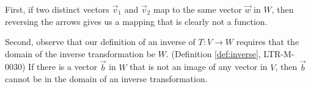 \documentclass{ximera}
\begin{document}
 First, if two distinct vectors $\vec{v}_1$ and $\vec{v}_2$ map to the same vector $\vec{w}$ in $W$, then reversing the arrows gives us a mapping that is clearly not a function. %
 

\begin{center}
\end{center}
  

Second, observe that our definition of an inverse of $T:V\rightarrow W$ requires that the domain of the inverse transformation be $W$. (Definition \ref{def:inverse}, LTR-M-0030)  If there is a vector $\vec{b}$ in $W$ that is not an image of any vector in $V$, then $\vec{b}$ cannot be in the domain of an inverse transformation. %

\begin{center}
  \label{fig:notonto} 
\end{center}
\end{document}
